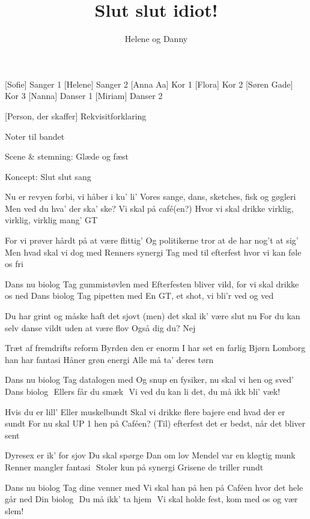 \documentclass[a4paper,11pt]{article}
\title{Slut slut idiot!}
\author{Helene og Danny}
\begin{document}
\maketitle

\begin{roles}
    [Sofie] Sanger 1
    [Helene] Sanger 2
    [Anna Aa] Kor 1
[Flora] Kor 2
[Søren Gade] Kor 3
    [Nanna] Danser 1
[Miriam] Danser 2
\end{roles}

\begin{props}
    [Person, der skaffer] Rekvisitforklaring
\end{props}

\scene
Noter til bandet


Scene \& stemning:
Glæde og fæst



Koncept:
Slut slut sang


\begin{song}
Nu er revyen forbi, vi håber i ku' li'
Vores sange, dans, sketches, fisk og gøgleri
Men ved du hva' der ska' ske? Vi skal på café(en?)
Hvor vi skal drikke virklig, virklig, virklig mang’ GT

For vi prøver hårdt på at være flittig'
Og politikerne tror at de har nog't at sig'
Men hvad skal vi dog med Renners synergi
Tag med til efterfest hvor vi kan føle os fri

\newpage


Dans nu biolog
Tag gummistøvlen med
Efterfesten bliver vild, for vi skal drikke os ned
Dans biolog
Tag pipetten med
En GT, et shot, vi bli’r ved og ved

Du har grint og måske haft det sjovt
(men) det skal ik' være slut nu
For du kan selv danse vildt uden at være flov
Også dig du? Nej

Træt af fremdrifts reform
Byrden den er enorm
I har set en farlig Bjørn
Lomborg han har fantasi
Håner grøn energi
Alle må ta’ deres tørn

Dans nu biolog
Tag datalogen med
Og snup en fysiker, nu skal vi hen og sved’ 
Dans biolog 
Ellers får du smæk 
Vi ved du kan li det, du må ikk bli' væk!

Hvis du er lill’
Eller muskelbundt
Skal vi drikke flere bajere end hvad der er sundt
For nu skal UP 1 hen på Caféen?
(Til) efterfest det er bedst, når det bliver sent

Dyresex er ik’ for sjov
Du skal spørge Dan om lov
Mendel var en kløgtig munk
Renner mangler fantasi 
Stoler kun på synergi
Grisene de triller rundt


Dans nu biolog
Tag dine venner med
Vi skal han på hen på Caféen hvor det hele går ned 
Din biolog 
Du må ikk’ ta hjem 
Vi skal holde fest, kom med os og vær slem!
                     








\end{song}
\end{document}
